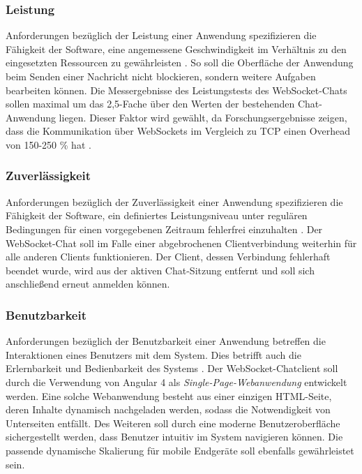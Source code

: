 \documentclass[11pt,a4paper,titlepage]{scrartcl}
\numberwithin{equation}{section}
\begin{document}
\subsubsection*{Leistung}
Anforderungen bezüglich der Leistung einer Anwendung spezifizieren die Fähigkeit der Software, eine angemessene Geschwindigkeit im Verhältnis zu den eingesetzten Ressourcen zu gewährleisten \autocite[315]{mairiza_investigation_2010}. So soll die Oberfläche der Anwendung beim Senden einer Nachricht nicht blockieren, sondern weitere Aufgaben bearbeiten können. Die Messergebnisse des Leistungstests des WebSocket-Chats sollen maximal um das 2,5-Fache über den Werten der bestehenden Chat-Anwendung liegen. Dieser Faktor wird gewählt, da Forschungsergebnisse zeigen, dass die Kommunikation über WebSockets im Vergleich zu TCP einen Overhead von 150-250 \% hat \autocite[1007]{skvorc_performance_2014}.

\subsubsection*{Zuverlässigkeit}
Anforderungen bezüglich der Zuverlässigkeit einer Anwendung spezifizieren die Fähigkeit der Software, ein definiertes Leistungsniveau unter regulären Bedingungen für einen vorgegebenen Zeitraum fehlerfrei einzuhalten \autocite[315]{mairiza_investigation_2010}. Der WebSocket-Chat soll im Falle einer abgebrochenen Clientverbindung weiterhin für alle anderen Clients funktionieren. Der Client, dessen Verbindung fehlerhaft beendet wurde, wird aus der aktiven Chat-Sitzung entfernt und soll sich anschließend erneut anmelden können.

\subsubsection*{Benutzbarkeit}
Anforderungen bezüglich der Benutzbarkeit einer Anwendung betreffen die Interaktionen eines Benutzers mit dem System. Dies betrifft auch die Erlernbarkeit und Bedienbarkeit des Systems \autocite[315]{mairiza_investigation_2010}. Der WebSocket-Chatclient soll durch die Verwendung von Angular 4 als \textit{Single-Page-Webanwendung} entwickelt werden. Eine solche Webanwendung besteht aus einer einzigen HTML-Seite, deren Inhalte dynamisch nachgeladen werden, sodass die Notwendigkeit von Unterseiten entfällt. Des Weiteren soll durch eine moderne Benutzeroberfläche sichergestellt werden, dass Benutzer intuitiv im System navigieren können. Die passende dynamische Skalierung für mobile Endgeräte soll ebenfalls gewährleistet sein.
\end{document}
